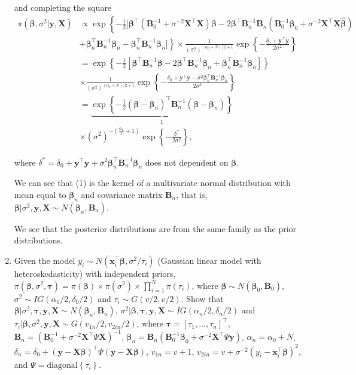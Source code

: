 \begin{enumerate}[leftmargin=*]
and completing the square
\begin{align*}
	\pi(\bm{\beta}, \sigma^2|{\bm{y}}, {\bm{X}}) & \propto \exp\left\{-\frac{1}{2}[\bm{\beta}^{\top}({\bm{B}}_0^{-1}+\sigma^{-2} {\bm{X}}^{\top}{\bm{X}})\bm{\beta}-2\bm{\beta}^{\top}{\bm{B}}_n^{-1}{\bm{B}}_n({\bm{B}}_0^{-1}\bm{\beta}_0+\sigma^{-2}{\bm{X}}^{\top}{\bm{X}}\hat{\bm{\beta}})\right.\\
	&\left.+\bm{\beta}^{\top}_n{\bm{B}}_n^{-1}\bm{\beta}_n-\bm{\beta}_n^{\top}{\bm{B}}_n^{-1}\bm{\beta}_n]\right\}\times\frac{1}{(\sigma^2)^{(\alpha_0+N)/2+1}}\exp\left\{-\frac{\delta_0+{\bm{y}}^{\top}{\bm{y}}}{2\sigma^2}\right\}\\
	&=\exp\left\{-\frac{1}{2}[\bm{\beta}^{\top}{\bm{B}}_n^{-1}\bm{\beta}-2\bm{\beta}^{\top}{\bm{B}}_n^{-1}\bm{\beta}_n+\bm{\beta}_n^{\top}{\bm{B}}_n^{-1}\bm{\beta}_n]\right\}\\
	& \times\frac{1}{(\sigma^2)^{(\alpha_0+N)/2+1}}\exp\left\{-\frac{\delta_0+{\bm{y}}^{\top}{\bm{y}}-\sigma^2\bm{\beta}_n^{\top}{\bm{B}}_n^{-1}\bm{\beta}_n}{2\sigma^2}\right\}\\
	&=\underbrace{\exp\left\{-\frac{1}{2}(\bm{\beta}-\bm{\beta}_n)^{\top}{\bm{B}}_n^{-1}(\bm{\beta}-\bm{\beta}_n)\right\}}_1\\
	&\times(\sigma^2)^{-(\frac{\alpha_n}{2}+1)}\exp\left\{-\frac{\delta^{\ast}}{2\sigma^2}\right\},
\end{align*}

where $\delta^{\ast}=\delta_0+{\bm{y}}^{\top}{\bm{y}}+\sigma^2\bm{\beta}^{\top}_n{\bm{B}}_n^{-1}\bm{\beta}_n$ does not dependent on $\bm{\beta}$.

We can see that (1) is the kernel of a multivariate normal distribution with mean equal to $\bm{\beta}_n$ and covariance matrix ${\bm{B}}_n$, that is, $\bm{\beta}|\sigma^2,{\bm{y}},{\bm{X}}\sim N(\bm{\beta}_n,{\bm{B}}_n)$. 

We see that the posterior distributions are from the same family as the prior distributions.

\item Given the model $y_i\sim N({\bm{x}}_i^{\top}\bm{\beta}, \sigma^2/\tau_i)$ (Gaussian linear model with heteroskedasticity) with independent priors,  $\pi(\bm{\beta},\sigma^2,\bm{\tau})=\pi(\bm{\beta})\times\pi(\sigma^2)\times\prod_{i=1}^N\pi(\tau_i)$, where $\bm{\beta} \sim N(\bm{\beta}_0, {\bm{B}}_0)$, $\sigma^2 \sim IG(\alpha_0/2, \delta_0/2)$ and $\tau_i\sim G(v/2,v/2)$. Show that $\bm{\beta}|\sigma^2,\bm{\tau},{\bm{y}},{\bm{X}}\sim N(\bm{\beta}_n,{\bm{B}}_n)$, $\sigma^2|\bm{\beta},\bm{\tau},{\bm{y}},{\bm{X}}\sim IG(\alpha_n/2,\delta_n/2)$ and $\tau_i|\bm{\beta},\sigma^2,{\bm{y}},{\bm{X}}\sim G(v_{1n}/2,v_{2in}/2)$, where $\bm{\tau}=[\tau_1,\dots,\tau_n]^{\top}$, ${\bm{B}}_n=({\bm{B}}_0^{-1}+\sigma^{-2}{{\bm{X}}}^{\top}\Psi{{\bm{X}}})^{-1}$, $\bm{\beta}_n={\bm{B}}_n({\bm{B}}_0^{-1}\bm{\beta}_0+\sigma^{-2}{\bm{X}}^{\top}\Psi{\bm{y}})$, $\alpha_n=\alpha_0+N$, $\delta_n=\delta_0+({\bm{y}}-{\bm{X}}\bm{\beta})^{\top}\Psi({\bm{y}}-{\bm{X}}\bm{\beta})$, $v_{1n}=v+1$, $v_{2in}=v+\sigma^{-2}(y_i-{\bm{x}}_i^{\top}\bm{\beta})^2$, and $\Psi=\text{diagonal}\left\{\tau_i\right\}$.


\end{enumerate}

